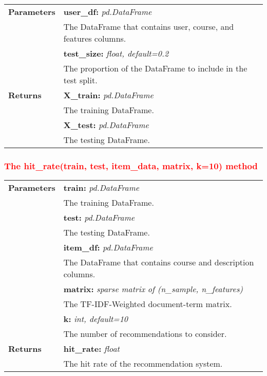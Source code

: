 \vspace{-7mm}
\begin{table}[H]
\small
\begin{tabularx}{\textwidth}{|p{2cm}|X|}
\hline
\textbf{Parameters} & \textbf{user\_df:} \textit{pd.DataFrame} \\ & \hspace{5mm} The DataFrame that contains user, course, and features columns. \\
& \textbf{test\_size:} \textit{float, default=0.2} \\ & \hspace{5mm} The proportion of the DataFrame to include in the test split. \\
\textbf{Returns} & \textbf{X\_train:} \textit{pd.DataFrame} \\ & \hspace{5mm} The training DataFrame. \\
& \textbf{X\_test:} \textit{pd.DataFrame} \\ & \hspace{5mm} The testing DataFrame. \\
\hline
\end{tabularx}
\end{table}

\subsubsection{\textcolor{red}{The hit\_rate(train, test, item\_data, matrix, k=10) method}}

\vspace{-7mm}
\begin{table}[H]
\small
\begin{tabularx}{\textwidth}{|p{2cm}|X|}
\hline
\textbf{Parameters} & \textbf{train:} \textit{pd.DataFrame} \\ & \hspace{5mm} The training DataFrame. \\
& \textbf{test:} \textit{pd.DataFrame} \\ & \hspace{5mm} The testing DataFrame. \\
& \textbf{item\_df:} \textit{pd.DataFrame} \\ & \hspace{5mm} The DataFrame that contains course and description columns. \\
& \textbf{matrix:} \textit{sparse matrix of (n\_sample, n\_features)} \\ & \hspace{5mm} The TF-IDF-Weighted document-term matrix. \\
& \textbf{k:} \textit{int, default=10} \\ & \hspace{5mm} The number of recommendations to consider. \\
\textbf{Returns} & \textbf{hit\_rate:} \textit{float} \\ & \hspace{5mm} The hit rate of the recommendation system. \\
\hline
\end{tabularx}
\end{table}

